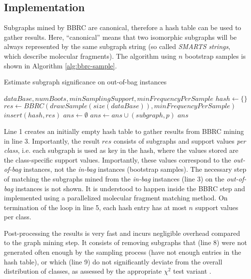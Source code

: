 \documentclass{article}
\begin{document}
\subsection{Implementation}
Subgraphs mined by BBRC are canonical, therefore a hash table can be used to gather results. Here, ``canonical'' means that two isomorphic subgraphs will be always represented by the same subgraph string (so called \emph{SMARTS strings}, which describe molecular fragments). The algorithm using $n$ bootstrap samples is shown in Algorithm \ref{alg:bbrc-sample}.
\renewcommand{\algorithmicrequire}{\textbf{Input:}}
\renewcommand{\algorithmicensure}{\textbf{Output:}}
\begin{algorithm}
  \caption{Estimate subgraph significance on out-of-bag instances}
  \label{alg:bbrc-sample}
\begin{algorithmic}[1]
  \Require $dataBase, numBoots, minSamplingSupport, minFrequencyPerSample$
  \State $hash \gets \{\}$
   
    \State $res \gets BBRC(drawSample(size(dataBase)), minFrequencyPerSample)$
    \State $insert(hash,res)$
  \EndFor
  \State $ans \gets \emptyset$
        \State $ans\gets ans \cup (subgraph,p)$
      \EndIf
    \EndIf
  \EndFor
  \Ensure $ans$
\end{algorithmic}
\end{algorithm}

Line 1 creates an initially empty hash table to gather results from BBRC mining in line 3. Importantly, the result $res$ consists of subgraphs and support values \emph{per class}, i.e. each subgraph is used as key in the hash, where the values stored are the class-specific support values. Importantly, these values correspond to the \emph{out-of-bag} instances, not the \emph{in-bag} instances (bootstrap samples). The necessary step of matching the subgraphs mined from the \emph{in-bag} instances (line 3) on the \emph{out-of-bag} instances is not shown. It is understood to happen inside the BBRC step and implemented using a parallelized molecular fragment matching method. On termination of the loop in line 5, each hash entry has at most $n$ support values per class.

Post-processing the results is very fast and incurs negligible overhead compared to the graph mining step. It consists of removing subgraphs that (line 8) were not generated often enough by the sampling process (have not enough entries in the hash table), or which (line 9) do not significantly deviate from the overall distribution of classes, as assessed by the appropriate $\chi^2$ test variant .
\end{document}
